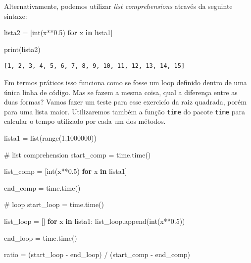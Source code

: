 \documentclass[
  brazilian,
  letterpaper,
  DIV=11,
  numbers=noendperiod]{scrreprt}
\newenvironment{Shaded}{\begin{snugshade}}{\end{snugshade}}
\newcommand{\BuiltInTok}[1]{\textcolor[rgb]{0.00,0.23,0.31}{#1}}
\newcommand{\CommentTok}[1]{\textcolor[rgb]{0.37,0.37,0.37}{#1}}
\newcommand{\ControlFlowTok}[1]{\textcolor[rgb]{0.00,0.23,0.31}{\textbf{#1}}}
\newcommand{\DecValTok}[1]{\textcolor[rgb]{0.68,0.00,0.00}{#1}}
\newcommand{\FloatTok}[1]{\textcolor[rgb]{0.68,0.00,0.00}{#1}}
\newcommand{\KeywordTok}[1]{\textcolor[rgb]{0.00,0.23,0.31}{\textbf{#1}}}
\newcommand{\NormalTok}[1]{\textcolor[rgb]{0.00,0.23,0.31}{#1}}
\newcommand{\OperatorTok}[1]{\textcolor[rgb]{0.37,0.37,0.37}{#1}}
\begin{document}
Alternativamente, podemos utilizar \emph{list comprehensions} através da
seguinte sintaxe:

\begin{Shaded}
\begin{Highlighting}[]
\NormalTok{lista2 }\OperatorTok{=}\NormalTok{ [}\BuiltInTok{int}\NormalTok{(x}\OperatorTok{**}\FloatTok{0.5}\NormalTok{) }\ControlFlowTok{for}\NormalTok{ x }\KeywordTok{in}\NormalTok{ lista1] }

\BuiltInTok{print}\NormalTok{(lista2)}
\end{Highlighting}
\end{Shaded}

\begin{verbatim}
[1, 2, 3, 4, 5, 6, 7, 8, 9, 10, 11, 12, 13, 14, 15]
\end{verbatim}

Em termos práticos isso funciona como se fosse um loop definido dentro
de uma única linha de código. Mas se fazem a mesma coisa, qual a
diferença entre as duas formas? Vamos fazer um teste para esse exercicío
da raiz quadrada, porém para uma lista maior. Utilizaremos também a
função \texttt{time} do pacote \texttt{time} para calcular o tempo
utilizado por cada um dos métodos.

\begin{Shaded}
\begin{Highlighting}[]
\NormalTok{lista1 }\OperatorTok{=} \BuiltInTok{list}\NormalTok{(}\BuiltInTok{range}\NormalTok{(}\DecValTok{1}\NormalTok{,}\DecValTok{1000000}\NormalTok{))}

\CommentTok{\# list comprehension}
\NormalTok{start\_comp }\OperatorTok{=}\NormalTok{ time.time()}

\NormalTok{list\_comp  }\OperatorTok{=}\NormalTok{ [}\BuiltInTok{int}\NormalTok{(x}\OperatorTok{**}\FloatTok{0.5}\NormalTok{) }\ControlFlowTok{for}\NormalTok{ x }\KeywordTok{in}\NormalTok{ lista1]}

\NormalTok{end\_comp   }\OperatorTok{=}\NormalTok{ time.time()}


\CommentTok{\# loop}
\NormalTok{start\_loop }\OperatorTok{=}\NormalTok{ time.time()}

\NormalTok{list\_loop }\OperatorTok{=}\NormalTok{ []}
\ControlFlowTok{for}\NormalTok{ x }\KeywordTok{in}\NormalTok{ lista1:}
\NormalTok{    list\_loop.append(}\BuiltInTok{int}\NormalTok{(x}\OperatorTok{**}\FloatTok{0.5}\NormalTok{))  }
    
\NormalTok{end\_loop   }\OperatorTok{=}\NormalTok{ time.time()}

\NormalTok{ratio }\OperatorTok{=}\NormalTok{ (start\_loop }\OperatorTok{{-}}\NormalTok{ end\_loop) }\OperatorTok{/}\NormalTok{ (start\_comp }\OperatorTok{{-}}\NormalTok{ end\_comp)}
\end{Highlighting}
\end{Shaded}
\end{document}
